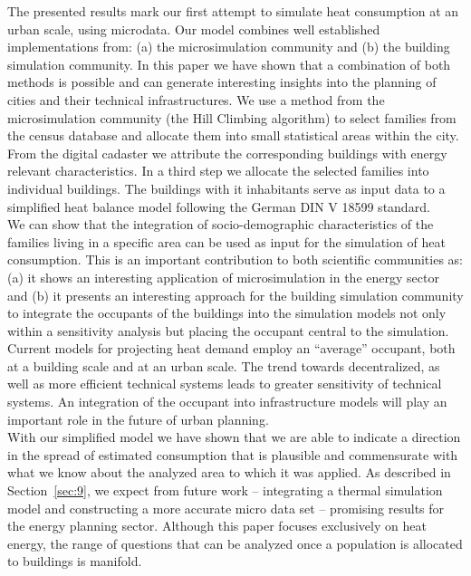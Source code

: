 \documentclass[11pt]{IJM-article}
\begin{document}
The presented results mark our first attempt to simulate heat consumption at an
urban scale, using microdata. Our model combines well established
implementations from: (a) the microsimulation community and (b) the building
simulation community. In this paper we have shown that a combination of both
methods is possible and can generate interesting insights into the planning of
cities and their technical infrastructures. We use a method from the
microsimulation community (the Hill Climbing algorithm) to select families from
the census database and allocate them into small statistical areas within the
city. From the digital cadaster we attribute the corresponding buildings with
energy relevant characteristics. In a third step we allocate the selected
families into individual buildings. The buildings with it inhabitants serve as
input data to a simplified heat balance model following the German DIN V 18599
standard.\\

We can show that the integration of socio-demographic characteristics of the
families living in a specific area can be used as input for the simulation of
heat consumption. This is an important contribution to both scientific
communities as: (a) it shows an interesting application of microsimulation in
the energy sector and (b) it presents an interesting approach for the building
simulation community to integrate the occupants of the buildings into the
simulation models not only within a sensitivity analysis but placing the
occupant central to the simulation.  Current models for projecting heat demand
employ an ``average'' occupant, both at a building scale and at an urban scale.
The trend towards decentralized, as well as more efficient technical systems
leads to greater sensitivity of technical systems. An integration of the
occupant into infrastructure models will play an important role in the future
of urban planning.\\

With our simplified model we have shown that we are able to indicate a
direction in the spread of estimated consumption that is plausible and
commensurate with what we know about the analyzed area to which it was applied.
As described in Section~\ref{sec:9}, we expect from future work -- integrating
a thermal simulation model and constructing a more accurate micro data set --
promising results for the energy planning sector. Although this paper focuses
exclusively on heat energy, the range of questions that can be analyzed once a
population is allocated to buildings is manifold.\\
\end{document}
